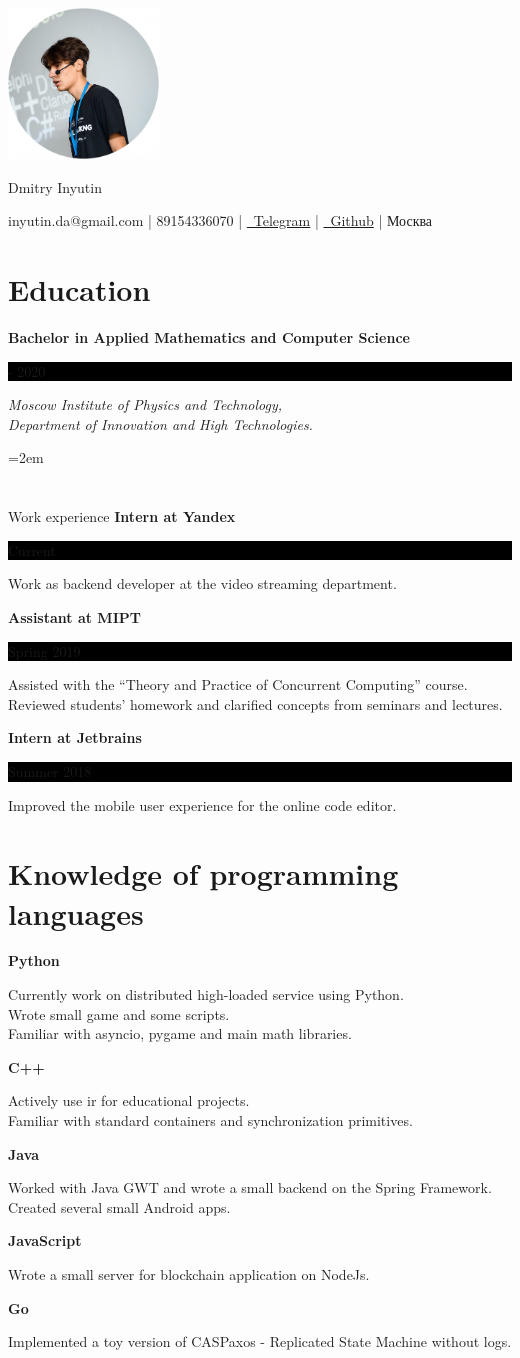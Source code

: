 \documentclass[fontsize=11pt]{article}
\newcommand{\MyName}[1]{ %
    \Huge \centering #1
    \par \normalsize \normalfont}
\newcommand{\NewPart}[1]{\section*{#1}}
\newcommand{\ProgrammingEntry}[2]{
    \noindent \textbf{#1} \hfill      %

    \noindent \small #2 %
    \normalsize \par}
\newcommand{\EducationEntry}[4]{
    \noindent \textbf{#1} \hfill      %
    \colorbox{Black}{
      \parbox{10em}{
      \color{White} \centering #2}} \par   %
    \noindent \textit{#3} \par        %
    \noindent\hangindent=2em\hangafter=0 \small #4 %
    \normalsize \par}
\newcommand{\WorkEntry}[3]{       %
    \noindent \large \textbf{#1} \hfill      %
    \colorbox{Black}{%
      \parbox{10em}{%
      \color{White} \centering #2}} \par  %
    \noindent \small #3 %
    \normalsize \par}
\begin{document}
\begin{minipage}{0.2\textwidth}%
\includegraphics[width=4cm]{me.png}
\end{minipage}%
\hfill%
\begin{minipage}{14cm}\raggedright
\bigskip
\bigskip
\bigskip
\bigskip
\bigskip
\bigskip
\MyName{Dmitry Inyutin}
\bigskip
{inyutin.da@gmail.com | 89154336070 | \href{https://t.me/inyutin}{\faTelegram \, Telegram} | \href{https://github.com/inyutin}{\faGithub \, Github} | Москва}
\end{minipage}



\NewPart{Education}{}
\EducationEntry
{Bachelor in Applied Mathematics and Computer Science}
{2016 - 2020}
{Moscow Institute of Physics and Technology, \\
 Department of Innovation and High Technologies.}

\NewPart{Work experience}{}
\WorkEntry
{Intern at Yandex}
{Current}
{Work as backend developer at the video streaming department.}

\bigskip

\WorkEntry
{Assistant at MIPT}
{Spring 2019}
{Assisted with the “Theory and Practice of Concurrent Computing” course. \\
 Reviewed students’ homework and clarified concepts from seminars and lectures.}

\bigskip

\WorkEntry
{Intern at Jetbrains}
{Summer 2018}
{Improved the mobile user experience for the online code editor.}

\NewPart{Knowledge of programming languages}{}
\ProgrammingEntry
{Python \bigstar \bigstar \bigstar}
{Currently work on distributed high-loaded service using Python. \\
Wrote small game and some scripts. \\
Familiar with asyncio, pygame and main math libraries.}
\bigskip
\ProgrammingEntry
{C++ \bigstar \bigstar \bigstar}
{Actively use ir for educational projects. \\ Familiar with standard containers and synchronization primitives.}
\bigskip
\ProgrammingEntry
{Java \bigstar \bigstar}
{Worked with Java GWT and wrote a small backend on the Spring Framework. \\
Created several small Android apps.}
\bigskip
\ProgrammingEntry
{JavaScript \bigstar \bigstar}
{Wrote a small server for blockchain application on NodeJs.}
\bigskip
\ProgrammingEntry
{Go \bigstar}
{Implemented a toy version of CASPaxos - Replicated State Machine without logs.}
\end{document}
